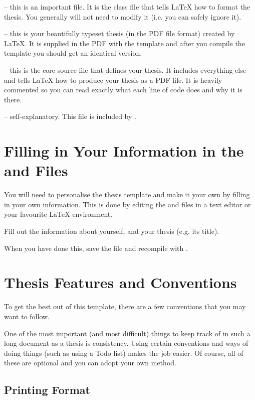  -- this is an important file. It is the class file that tells \LaTeX{} how to format the thesis. You generally will not need to modify it (i.e. you can safely ignore it).

 -- this is your beautifully typeset thesis (in the PDF file format) created by \LaTeX{}. It is supplied in the PDF with the template and after you compile the template you should get an identical version.

 -- this is the core source file that defines your thesis.
It includes everything else and tells \LaTeX{} how to produce your thesis as a PDF file.
It is heavily commented so you can read exactly what each line of code does and why it is there.

 -- self-explanatory. This file is included by .

\section{Filling in Your Information in the  and  Files}\label{FillingFile}

You will need to personalise the thesis template and make it your own by filling in your own information. This is done by editing the  and  files in a text editor or your favourite \LaTeX{} environment.

Fill out the information about yourself, and your thesis (e.g. its title).

When you have done this, save the file and recompile with . 

\section{Thesis Features and Conventions}\label{ThesisConventions}

To get the best out of this template, there are a few conventions that you may want to follow.

One of the most important (and most difficult) things to keep track of in such a long document as a thesis is consistency. Using certain conventions and ways of doing things (such as using a Todo list) makes the job easier. Of course, all of these are optional and you can adopt your own method.

\subsection{Printing Format}

